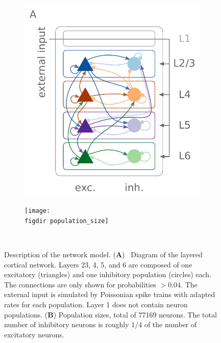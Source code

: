 \begin{figure}[tb]
    \centering 
    \begin{subfigure}[b]{0.45\textwidth} 
        \includegraphics[width=\textwidth]{../figures/diagram_colored}
        \label{fig:diagram}
    \end{subfigure}
    \begin{subfigure}[b]{0.45\textwidth}
        \texttt{[image: \\figdir population\_size]}
        \label{fig:population_size}
    \end{subfigure} ~
    \caption{
        Description of the network model. 
        (\textbf{A})~%
        Diagram of the layered cortical network. 
        Layers 23, 4, 5, and 6 are composed of one excitatory
        (triangles) and one inhibitory population (circles) each.
        The connections are only shown for probabilities $>0.04$. 
        The external input is simulated by Poissonian spike trains
        with adapted rates for each population. 
        Layer 1 does not contain neuron populations.
        (\textbf{B})
        Population sizes, total of 77169 neurons. The total number of inhibitory neurons is roughly
        $1 / 4$ of the number of excitatory neurons. 
    }
    \label{fig:model_description} 
\end{figure}

